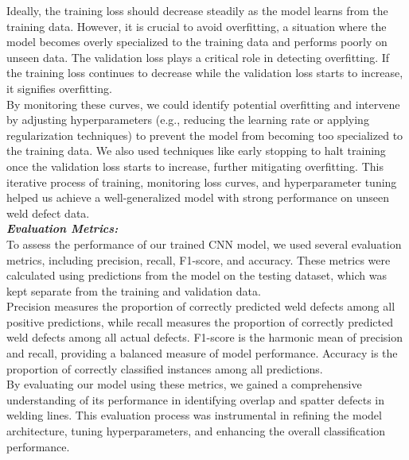 \documentclass{article_saj}
\begin{document}
\indent Ideally, the training loss should decrease steadily as the model learns from the training data. However, it is crucial to avoid overfitting, a situation where the model becomes overly specialized to the training data and performs poorly on unseen data. The validation loss plays a critical role in detecting overfitting. If the training loss continues to decrease while the validation loss starts to increase, it signifies overfitting.\\

\indent By monitoring these curves, we could identify potential overfitting and intervene by adjusting hyperparameters (e.g., reducing the learning rate or applying regularization techniques) to prevent the model from becoming too specialized to the training data. We also used techniques like early stopping to halt training once the validation loss starts to increase, further mitigating overfitting. This iterative process of training, monitoring loss curves, and hyperparameter tuning helped us achieve a well-generalized model with strong performance on unseen weld defect data.\\

\indet \textbf{\textit{Evaluation Metrics:}}\\
To assess the performance of our trained CNN model, we used several evaluation metrics, including precision, recall, F1-score, and accuracy. These metrics were calculated using predictions from the model on the testing dataset, which was kept separate from the training and validation data.\\

\indent Precision measures the proportion of correctly predicted weld defects among all positive predictions, while recall measures the proportion of correctly predicted weld defects among all actual defects. F1-score is the harmonic mean of precision and recall, providing a balanced measure of model performance. Accuracy is the proportion of correctly classified instances among all predictions.\\

\indent By evaluating our model using these metrics, we gained a comprehensive understanding of its performance in identifying overlap and spatter defects in welding lines. This evaluation process was instrumental in refining the model architecture, tuning hyperparameters, and enhancing the overall classification performance.\\
\end{document}
